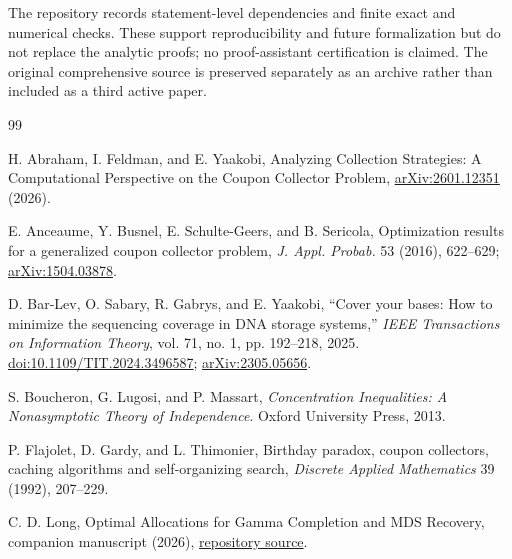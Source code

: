 \documentclass[11pt]{article}
\theoremstyle{definition}
\theoremstyle{remark}
\newcommand{\1}{\mathbf 1}
\begin{document}
The repository records statement-level dependencies and finite exact
and numerical checks. These support reproducibility and future
formalization but do not replace the analytic proofs; no
proof-assistant certification is claimed. The original comprehensive
source is preserved separately as an archive rather than included as
a third active paper.

\begin{thebibliography}{99}\raggedright

 H. Abraham, I. Feldman, and E. Yaakobi,
Analyzing Collection Strategies: A Computational Perspective on the Coupon Collector Problem,
\href{https://arxiv.org/abs/2601.12351}{arXiv:2601.12351} (2026).

 E. Anceaume, Y. Busnel, E. Schulte-Geers, and B. Sericola,
Optimization results for a generalized coupon collector problem,
\emph{J. Appl. Probab.} 53 (2016), 622--629;
\href{https://arxiv.org/abs/1504.03878}{arXiv:1504.03878}.

D. Bar-Lev, O. Sabary, R. Gabrys, and E. Yaakobi,
``Cover your bases: How to minimize the sequencing coverage in DNA storage systems,''
\emph{IEEE Transactions on Information Theory}, vol. 71, no. 1, pp. 192--218, 2025.
\href{https://doi.org/10.1109/TIT.2024.3496587}{doi:10.1109/TIT.2024.3496587};
\href{https://arxiv.org/abs/2305.05656}{arXiv:2305.05656}.

S. Boucheron, G. Lugosi, and P. Massart,
\emph{Concentration Inequalities: A Nonasymptotic Theory of Independence}.
Oxford University Press, 2013.

 P. Flajolet, D. Gardy, and L. Thimonier,
Birthday paradox, coupon collectors, caching algorithms and self-organizing search,
\emph{Discrete Applied Mathematics} 39 (1992), 207--229.

 C. D. Long,
Optimal Allocations for Gamma Completion and MDS Recovery,
companion manuscript (2026),
\href{https://github.com/long-mathematics/mds-coverage-optimization/blob/main/gamma_mds_active_uniform.tex}{repository source}.
\end{thebibliography}
\end{document}
